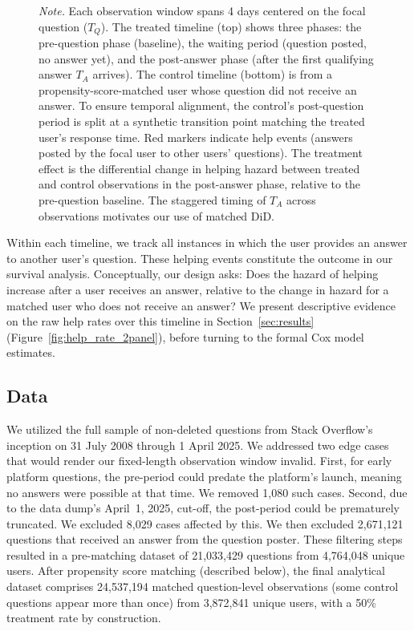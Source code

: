 \begin{figure}
\vspace{0.5em}
\parbox{\textwidth}{\footnotesize\textit{Note.} Each observation window spans 4 days centered on the focal question ($T_Q$). The treated timeline (top) shows three phases: the pre-question phase (baseline), the waiting period (question posted, no answer yet), and the post-answer phase (after the first qualifying answer $T_A$ arrives). The control timeline (bottom) is from a propensity-score-matched user whose question did not receive an answer. To ensure temporal alignment, the control's post-question period is split at a synthetic transition point matching the treated user's response time. Red markers indicate help events (answers posted by the focal user to other users' questions). The treatment effect is the differential change in helping hazard between treated and control observations in the post-answer phase, relative to the pre-question baseline. The staggered timing of $T_A$ across observations motivates our use of matched DiD.}
\end{figure}

Within each timeline, we track all instances in which the user provides an answer to another user's question. These helping events constitute the outcome in our survival analysis. Conceptually, our design asks: Does the hazard of helping increase after a user receives an answer, relative to the change in hazard for a matched user who does not receive an answer? We present descriptive evidence on the raw help rates over this timeline in Section~\ref{sec:results} (Figure~\ref{fig:help_rate_2panel}), before turning to the formal Cox model estimates.

\subsection{Data}

We utilized the full sample of non-deleted questions from Stack Overflow's inception on 31 July 2008 through 1 April 2025. We addressed two edge cases that would render our fixed-length observation window invalid. First, for early platform questions, the pre-period could predate the platform's launch, meaning no answers were possible at that time. We removed 1,080 such cases. Second, due to the data dump's April~1, 2025, cut-off, the post-period could be prematurely truncated. We excluded 8,029 cases affected by this. We then excluded 2,671,121 questions that received an answer from the question poster. These filtering steps resulted in a pre-matching dataset of 21,033,429 questions from 4,764,048 unique users. After propensity score matching (described below), the final analytical dataset comprises 24,537,194 matched question-level observations (some control questions appear more than once) from 3,872,841 unique users, with a 50\% treatment rate by construction.

